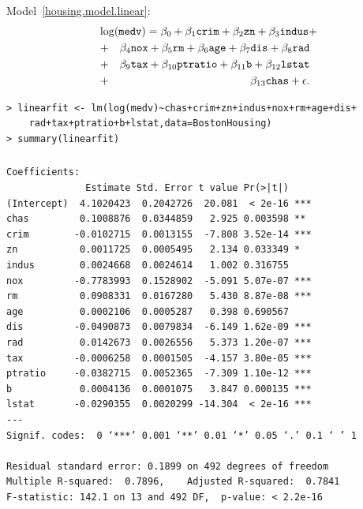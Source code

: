 \documentclass{beamer}
\newcommand{\bs}{\bigskip}
\begin{document}
\begin{frame}[fragile]
\frametitle{}

Model~\eqref{housing.model.linear}:
\begin{eqnarray}
\label{housing.model.linear}
\lefteqn{\log(\texttt{medv}) = \beta_0 + \beta_1\texttt{crim} + \beta_2\texttt{zn}+
\beta_3\texttt{indus}+ } \nonumber \\
& + & \beta_4\texttt{nox} + \beta_5\texttt{rm} + \beta_6\texttt{age} +
\beta_7\texttt{dis} + \beta_8\texttt{rad} \nonumber \\
& + & \beta_9\texttt{tax} + \beta_{10}\texttt{ptratio} + \beta_{11}\texttt{b} +
\beta_{12}\texttt{lstat} \nonumber \\
& + & \beta_{13} \texttt{chas} + \epsilon.
\end{eqnarray}

\bs 

{\scriptsize
\begin{verbatim}
> linearfit <- lm(log(medv)~chas+crim+zn+indus+nox+rm+age+dis+
    rad+tax+ptratio+b+lstat,data=BostonHousing)
> summary(linearfit)
\end{verbatim}
}

\end{frame}


\begin{frame}[fragile]
\frametitle{}

{\scriptsize
\begin{verbatim}
Coefficients:
              Estimate Std. Error t value Pr(>|t|)    
(Intercept)  4.1020423  0.2042726  20.081  < 2e-16 ***
chas         0.1008876  0.0344859   2.925 0.003598 ** 
crim        -0.0102715  0.0013155  -7.808 3.52e-14 ***
zn           0.0011725  0.0005495   2.134 0.033349 *  
indus        0.0024668  0.0024614   1.002 0.316755    
nox         -0.7783993  0.1528902  -5.091 5.07e-07 ***
rm           0.0908331  0.0167280   5.430 8.87e-08 ***
age          0.0002106  0.0005287   0.398 0.690567    
dis         -0.0490873  0.0079834  -6.149 1.62e-09 ***
rad          0.0142673  0.0026556   5.373 1.20e-07 ***
tax         -0.0006258  0.0001505  -4.157 3.80e-05 ***
ptratio     -0.0382715  0.0052365  -7.309 1.10e-12 ***
b            0.0004136  0.0001075   3.847 0.000135 ***
lstat       -0.0290355  0.0020299 -14.304  < 2e-16 ***
---
Signif. codes:  0 ‘***’ 0.001 ‘**’ 0.01 ‘*’ 0.05 ‘.’ 0.1 ‘ ’ 1

Residual standard error: 0.1899 on 492 degrees of freedom
Multiple R-squared:  0.7896,	Adjusted R-squared:  0.7841 
F-statistic: 142.1 on 13 and 492 DF,  p-value: < 2.2e-16
\end{verbatim}
}

\end{frame}
\end{document}
